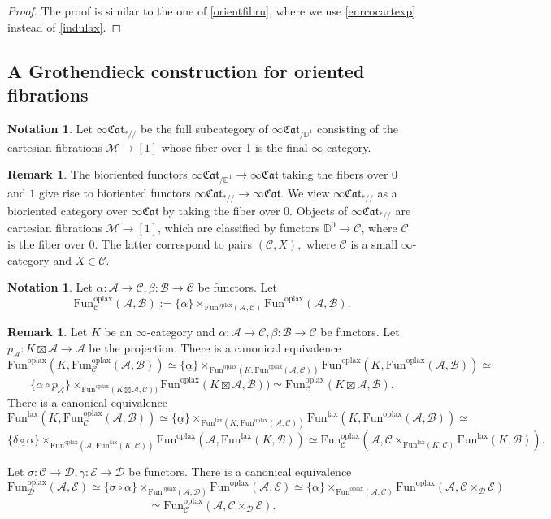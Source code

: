 \documentclass[10pt,oneside]{article}
\numberwithin{equation}{section} %
\numberwithin{figure}{section} %
\theoremstyle{plain}
\theoremstyle{definition}
\newtheorem{notation}[theorem]{Notation}
\newtheorem{remark}[theorem]{Remark}
\newcommand{\bD}{{\mathbb D}}
\newcommand{\mA}{{\mathcal A}}
\newcommand{\mB}{{\mathcal B}}
\newcommand{\mC}{{\mathcal C}}
\newcommand{\mD}{{\mathcal D}}
\newcommand{\mE}{{\mathcal E}}
\newcommand{\mM}{{\mathcal M}}
\newcommand{\Fun}{\mathrm{Fun}}
\newcommand{\lax}{{\mathrm{lax}}}
\newcommand{\oplax}{{\mathrm{oplax}}}
\newcommand{\fcat}{\mathfrak{Cat}}
\begin{document}
\begin{proof}

The proof is similar to the one of \cref{orientfibru}, where we use
\cref{enrcocartexp} instead of \cref{indulax}.   
\end{proof}

\subsection{A Grothendieck construction for oriented fibrations}

\begin{notation}
Let $\infty\fcat_{*//} $ be the full subcategory of $\infty\fcat_{/\bD^1}$ consisting of the cartesian fibrations $\mM \to [1]$ whose fiber over 1 is the final $\infty$-category.
\end{notation}

\begin{remark}
The bioriented functors $\infty\fcat_{/\bD^1} \to \infty\fcat$ taking the fibers over $0$ and $1$ give rise to bioriented functors $\infty\fcat_{*//} \to \infty\fcat$.
We view $\infty\fcat_{*//}$ as a bioriented category over $\infty\fcat$ by taking the fiber over 0.
Objects of $\infty\fcat_{*//}$ are cartesian fibrations $\mM \to [1]$,
which are classified by functors
$\bD^0 \to \mC$, where $\mC$ is the fiber over 0.
The latter correspond to pairs $(\mC,X),$ where $\mC $ is a small $\infty$-category and $X \in \mC.$  
\end{remark}

\begin{notation}
Let $\alpha: \mA \to \mC, \beta: \mB \to \mC$ be functors.
Let $$\Fun^\oplax_\mC(\mA,\mB):= \{\alpha\}\times_{\Fun^\oplax(\mA,\mC)} \Fun^\oplax(\mA,\mB).$$

\end{notation}

\begin{remark}\label{remaros}
Let $K$ be an $\infty$-category and $\alpha: \mA \to \mC, \beta: \mB \to \mC$ be functors. Let $p_\mA: K \boxtimes \mA \to \mA$ be the projection.
There is a canonical equivalence
$$ \Fun^\oplax(K, \Fun^\oplax_\mC(\mA,\mB)) \simeq \{\underline{\alpha}\}\times_{\Fun^\oplax(K,\Fun^\oplax(\mA,\mC))} \Fun^\oplax(K,\Fun^\oplax(\mA,\mB)) \simeq $$$$\{\alpha \circ p_\mA \}\times_{\Fun^\oplax(K \boxtimes \mA,\mC))} \Fun^\oplax(K \boxtimes \mA,\mB)) \simeq \Fun^\oplax_\mC(K \boxtimes \mA,\mB).$$
There is a canonical equivalence
$$ \Fun^\lax(K, \Fun^\oplax_\mC(\mA,\mB)) \simeq \{\underline{\alpha}\}\times_{\Fun^\lax(K,\Fun^\oplax(\mA,\mC))} \Fun^\lax(K,\Fun^\oplax(\mA,\mB)) \simeq $$$$
\{\underline{\delta \circ \alpha}\}\times_{\Fun^\oplax(\mA,\Fun^\lax(K, \mC))} \Fun^\oplax(\mA,\Fun^\lax(K,\mB)) \simeq \Fun_\mC^\oplax(\mA,\mC \times_{\Fun^\lax(K, \mC)} \Fun^\lax(K, \mB)).$$

Let $\sigma : \mC \to \mD, \gamma: \mE \to \mD$ be functors.
There is a canonical equivalence
$$ \Fun^\oplax_\mD(\mA,\mE) \simeq \{\sigma \circ \alpha\}\times_{\Fun^\oplax(\mA,\mD)} \Fun^\oplax(\mA,\mE) \simeq \{\alpha\}\times_{\Fun^\oplax(\mA,\mC)} \Fun^\oplax(\mA,\mC \times_\mD \mE)$$$$ \simeq \Fun^\oplax_\mC(\mA,\mC \times_\mD \mE).$$
    
\end{remark}
\end{document}
